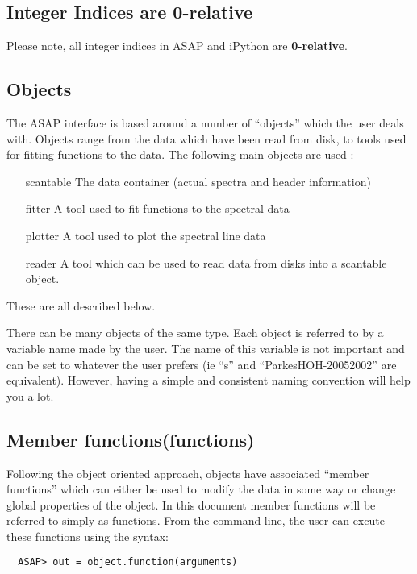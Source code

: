 \documentclass[11pt]{article}
\begin{document}
\subsection {Integer Indices are 0-relative}

Please note, all integer indices in ASAP and iPython are {\bf 0-relative}.

\subsection{Objects}

The ASAP interface is based around a number of ``objects'' which the
user deals with. Objects range from the data which have been read from
disk, to tools used for fitting functions to the data. The following
main objects are used :

\begin{itemize}
  \item[scantable] The data container (actual spectra and header information)
  \item[fitter] A tool used to fit functions to the spectral data
  \item[plotter] A tool used to plot the spectral line data
  \item[reader] A tool which can be used to read data from disks
    into a scantable object.
\end{itemize}

These are all described below.

There can be many objects of the same type. Each object is referred to 
by a variable name made by the user. The name of this variable is not
important and can be set to whatever the user prefers (ie ``s'' and
``ParkesHOH-20052002'' are equivalent).  However, having a simple and
consistent naming convention will help you a lot.

\subsection{Member functions(functions)}

Following the object oriented approach, objects have associated
``member functions'' which can either be used to modify the data in
some way or change global properties of the object. In this document
member functions will be referred to simply as functions. From the
command line, the user can excute these functions using the syntax:
\begin{verbatim}
  ASAP> out = object.function(arguments)
\end{verbatim}
\end{document}
